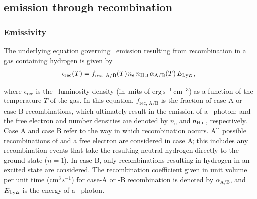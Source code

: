 \subsection{\texorpdfstring{\lya}{\lyatext} emission through recombination}
\label{chPssec:Lya recombination emission}

\subsubsection{Emissivity}
\label{chPsssec:Recombination emissivity}

The underlying equation governing \lya\ emission resulting from recombination in a gas containing hydrogen is given by \citep[see e.g.][]{2014PASA...31...40D, 2016MNRAS.462.1961S}
\begin{equation}
    \label{chPeq:Recombination emissivity}
    \epsilon_\text{rec}(T) = f_\text{rec, A/B} (T) \, n_\text{e} \, n_\text{\ion{H}{II}} \, \alpha_\text{A/B}(T) \, E_\text{\lya} \, ,
\end{equation}

\noindent where $\epsilon_\text{rec}$ is the \lya\ luminosity density (in units of $\mathrm{erg \, s^{-1} \, cm^{-3}}$) as a function of the temperature $T$ of the gas. In this equation, $f_\text{rec, A/B}$ is the fraction of case-A or case-B recombinations, which ultimately result in the emission of a \lya\ photon; and the free electron and  number densities are denoted by $n_\text{e}$ and $n_\text{\ion{H}{II}}$, respectively. Case A and case B refer to the way in which recombination occurs. All possible recombinations of  and a free electron are considered in case A; this includes any recombination events that take the resulting neutral hydrogen directly to the ground state ($n=1$). In case B, only recombinations resulting in hydrogen in an excited state are considered. The recombination coefficient given in unit volume per unit time ($\mathrm{cm^{3} \, s^{-1}}$) for case-A or -B recombination is denoted by $\alpha_\text{A/B}$, and $E_\text{{Ly\ensuremath{\upalpha}}}$ is the energy of a \lya\ photon.

